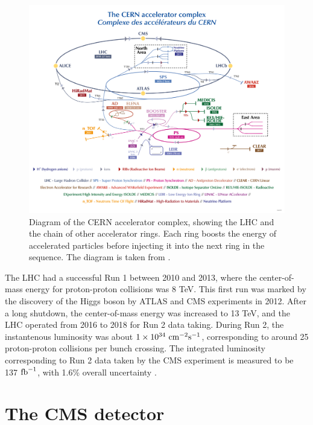 \begin{figure}[htb]
    \begin{minipage}[t]{\linewidth}\centering
        \includegraphics[width=15cm]{lhc_complex.png}
    \end{minipage}
    \caption{Diagram of the CERN accelerator complex, showing the LHC and the chain of other accelerator rings. 
    Each ring boosts the energy of accelerated particles before injecting it into the next ring in the sequence.
    The diagram is taken from \cite{LHCAcceleratorComplex}.}
    \label{fig:lhc_diagram}
\end{figure}

The LHC had a successful Run 1 between 2010 and 2013, where the center-of-mass energy for proton-proton collisions was 8 TeV. This first run was marked 
by the discovery of the Higgs boson by ATLAS and CMS experiments in 2012. After a long shutdown, the center-of-mass energy was increased to 13 TeV, and the LHC
operated from 2016 to 2018 for Run 2 data taking. During Run 2, the instantenous luminosity was about $1 \times 10^{34} \ \textrm{cm}^{-2}\textrm{s}^{-1}$, corresponding to around 
25 proton-proton collisions per bunch crossing. The integrated luminosity corresponding to Run 2 data taken by the CMS experiment is measured to be 137 $\textrm{fb}^{-1}$, 
with 1.6\% overall uncertainty \cite{lumi:2018,lumi:2017,lumi:2016}.

\section{The CMS detector}

